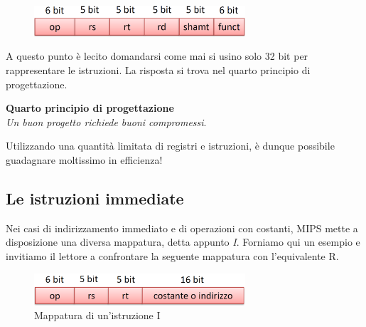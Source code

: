 \documentclass[class=book, crop=false]{standalone}
\begin{document}
\begin{figure}[H]
	\centering
	\includegraphics[width=0.7\textwidth,keepaspectratio]{mappatura.png}
\end{figure}

A questo punto è lecito domandarsi come mai si usino solo 32 bit per rappresentare le istruzioni. La risposta si trova nel quarto principio di progettazione.

\vspace{8pt}
\begin{tcolorbox}
\centering
\textbf{Quarto principio di progettazione}\\
\emph{Un buon progetto richiede buoni compromessi}.
\end{tcolorbox}
\vspace{5pt}

Utilizzando una quantità limitata di registri e istruzioni, è dunque possibile guadagnare moltissimo in efficienza!

\subsection{Le istruzioni immediate}
Nei casi di indirizzamento immediato e di operazioni con costanti, MIPS mette a disposizione una diversa mappatura, detta appunto \emph{I}. Forniamo qui un esempio e invitiamo il lettore a confrontare la seguente mappatura con l'equivalente R.
\begin{figure}[H]
	\centering
	\includegraphics[width=0.7\textwidth,keepaspectratio]{I.png}
	\caption{Mappatura di un'istruzione I}
\end{figure}
\end{document}
